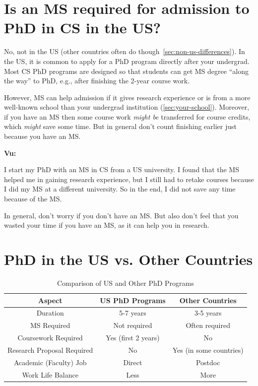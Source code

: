 \documentclass[oneside,11pt,dvipsnames]{book}
\newenvironment{commentbox}[1][]{
  \small
  \begin{mybox}
    {\small \textbf{#1}}
  }{
  \end{mybox}
}
\def\sectioninfo#1{%
  \addcontentsline{toc}{sectioninfo}{%
    \noexpand\numberline{}\color{black}{#1}}%
}
\begin{document}
\section{Is an MS required for admission to PhD in CS in the US?}\label{sec:msrequirement}
\sectioninfo{You do not need an MS to do PhD in CS.}


No, not in the US (other countries often do though~\autoref{sec:non-us-differences}).  In the US, it is common to apply for a PhD program directly after your undergrad.  Most CS PhD programs are designed so that students can get MS degree ``along the way'' to PhD, e.g., after finishing the 2-year course work. 

However, MS can help admission if it gives research experience or is from a more well-known school than your undergrad institution (\autoref{sec:your-school}).
Moreover, if you have an MS then some course work \emph{might be} transferred for course credits, which \emph{might} save some time. But in general don't count finishing earlier just because you have an MS. 

\begin{commentbox}[Vu:]
    I start my PhD with an MS in CS from a US university.  I found that the MS helped me in gaining research experience, but I still had to retake courses because I did my MS at a different university.  So in the end, I did not save any time because of the MS.
    
    In general, don't worry if you don't have an MS. But also don't feel that you wasted your time if you have an MS, as it can help you in research.
  \end{commentbox}



\section{PhD in the US vs. Other Countries}\label{sec:non-us-differences}
\sectioninfo{Among several differences, CS PhD in the US does not require an MS degree but has a longer PhD study time.}

\begin{table}
\caption{Comparison of US and Other PhD Programs}\label{tab:us-vs-other}
\begin{tabular}{c|c|c}
\toprule
\textbf{Aspect} & \textbf{US PhD Programs} & \textbf{Other Countries} \\
\midrule
Duration & 5-7 years & 3-5 years \\
MS Required & Not required & Often required \\
Coursework Required & Yes (first 2 years) & No \\
Research Proposal Required & No & Yes (in some countries) \\
Academic (Faculty) Job & Direct & Postdoc \\
Work Life Balance & Less & More \\
\bottomrule
\end{tabular}
\end{table}
\end{document}
